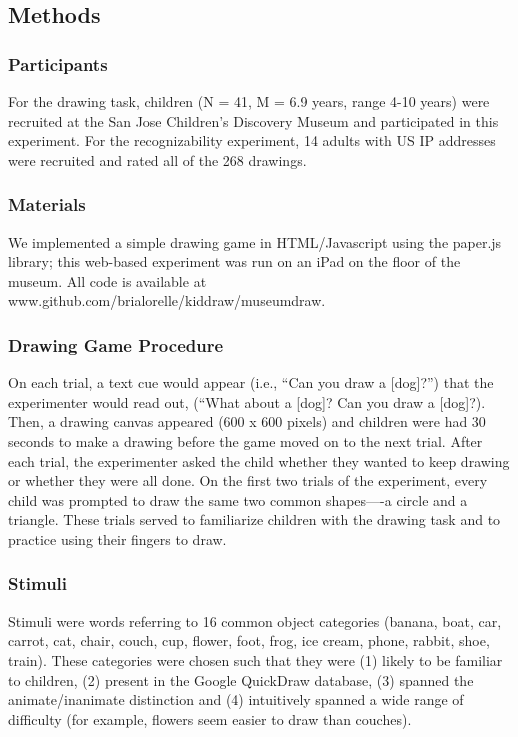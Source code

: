 \documentclass[10pt, letterpaper]{article}
\begin{document}
\subsection{Methods}\label{methods}

\subsubsection{Participants}\label{participants}

For the drawing task, children (N = 41, M = 6.9 years, range 4-10 years)
were recruited at the San Jose Children's Discovery Museum and
participated in this experiment. For the recognizability experiment, 14
adults with US IP addresses were recruited and rated all of the 268
drawings.

\subsubsection{Materials}\label{materials}

We implemented a simple drawing game in HTML/Javascript using the
paper.js library; this web-based experiment was run on an iPad on the
floor of the museum. All code is available at
www.github.com/brialorelle/kiddraw/museumdraw.

\subsubsection{Drawing Game Procedure}\label{drawing-game-procedure}

On each trial, a text cue would appear (i.e., ``Can you draw a
{[}dog{]}?'') that the experimenter would read out, (``What about a
{[}dog{]}? Can you draw a {[}dog{]}?). Then, a drawing canvas appeared
(600 x 600 pixels) and children were had 30 seconds to make a drawing
before the game moved on to the next trial. After each trial, the
experimenter asked the child whether they wanted to keep drawing or
whether they were all done. On the first two trials of the experiment,
every child was prompted to draw the same two common shapes----a circle
and a triangle. These trials served to familiarize children with the
drawing task and to practice using their fingers to draw.

\subsubsection{Stimuli}\label{stimuli}

Stimuli were words referring to 16 common object categories (banana,
boat, car, carrot, cat, chair, couch, cup, flower, foot, frog, ice
cream, phone, rabbit, shoe, train). These categories were chosen such
that they were (1) likely to be familiar to children, (2) present in the
Google QuickDraw database, (3) spanned the animate/inanimate distinction
and (4) intuitively spanned a wide range of difficulty (for example,
flowers seem easier to draw than couches).
\end{document}
